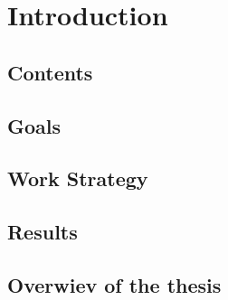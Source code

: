 \chapter{Introduction}
\section{Contents}

\section{Goals}
\section{Work Strategy}
\section{Results}
\section{Overwiev of the thesis}